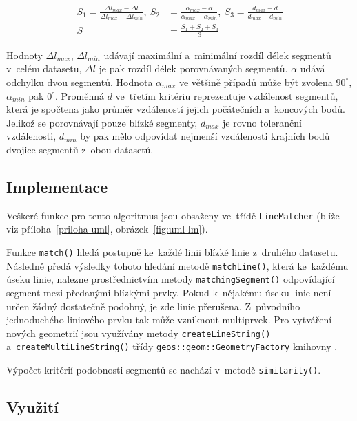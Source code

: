\begin{equation}
 \begin{aligned}
 S_1 = \frac{ \Delta l_{max} - \Delta l }{ \Delta l_{max} - \Delta l_{min}},\ 
 S_2 &= \frac{ \alpha_{max} - \alpha }{ \alpha_{max} - \alpha_{min}},\ 
 S_3 = \frac{ d_{max} - d }{ d_{max} - d_{min}}\\
 S &= \frac{S_1+S_2+S_3}{3}
 \label{crit}
 \end{aligned}
\end{equation}

Hodnoty $\Delta l_{max}$, $\Delta l_{min}$ udávají maximální a~minimální rozdíl délek
segmentů v~celém datasetu, $\Delta l$ je pak rozdíl délek porovnávaných segmentů.
$\alpha$ udává odchylku dvou segmentů. Hodnota $\alpha_{max}$ ve většině případů může
být zvolena $90^{\circ}$, $\alpha_{min}$ pak $0^\circ$. Proměnná $d$ ve~třetím 
kritériu reprezentuje vzdálenost segmentů, která je spočtena jako průměr vzdáleností
jejich počátečních a~koncových bodů. Jelikož se porovnávají pouze blízké segmenty,
$d_{max}$ je rovno toleranční vzdálenosti, $d_{min}$ by pak mělo odpovídat nejmenší
vzdálenosti krajních bodů dvojice segmentů z~obou datasetů.


\subsection{Implementace}
\label{lm-implementace}

Veškeré funkce pro tento algoritmus jsou obsaženy ve~třídě \texttt{Line\-Matcher}
(blíže viz pří\-loha~\ref{priloha-uml}, obrázek~\ref{fig:uml-lm}).

Funkce \texttt{match()} hledá postupně ke~každé linii blízké linie z~druhého datasetu.
Následně předá výsledky tohoto hledání metodě \texttt{match\-Line()}, která ke~každému
úseku linie, nalezne prostřednictvím metody \texttt{matching\-Segment()} odpovídající
segment mezi předanými blíz\-kými prvky. Pokud k~nějakému úseku linie není určen
žádný dostatečně podobný, je zde linie přerušena. Z~původního jednoduchého liniového
prvku tak může vzniknout multiprvek. Pro vytváření nových geometrií jsou využívány
metody \texttt{createLineString()} a~\texttt{createMultiLineString()} třídy 
\texttt{geos::geom::GeometryFactory} knihovny \zk{GEOS}.
 
Výpočet kritérií podobnosti segmentů se nachází v~metodě \texttt{similarity()}. 

\subsection{Využití}
\label{lm-vyuziti}

